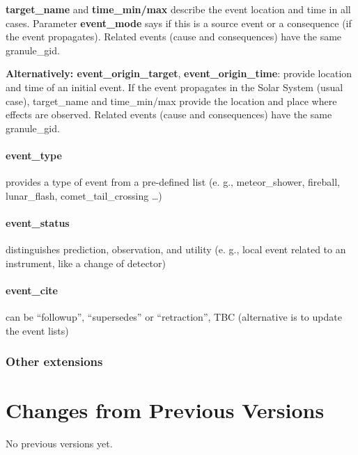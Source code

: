 \documentclass[11pt,a4paper]{ivoa}
\begin{document}
\textbf{ target\_name }and\textbf{ time\_min/max} describe the event location and time in all cases. Parameter \textbf{event\_mode} says if this is a source event or a consequence (if the event propagates). Related events (cause and consequences) have the same granule\_gid.

\textbf{\textbf{Alternatively}: event\_origin\_target}, \textbf{event\_origin\_time}: provide location and time of an initial event. If the event propagates in the Solar System (usual case), target\_name and time\_min/max provide the location and place where effects are observed. Related events (cause and consequences) have the same granule\_gid.

\paragraph{event\_type}

provides a type of event from a pre-defined list (e. g., meteor\_shower, fireball, lunar\_flash, comet\_tail\_crossing …)

\paragraph{event\_status}

distinguishes prediction, observation, and utility (e. g., local event related to an instrument, like a change of detector)

\paragraph{event\_cite}

can be ``followup'', ``supersedes'' or ``retraction'', TBC (alternative is to update the event lists)

\subsubsection{Other extensions\\}



\appendix
\section{Changes from Previous Versions}

No previous versions yet.  



\end{document}
